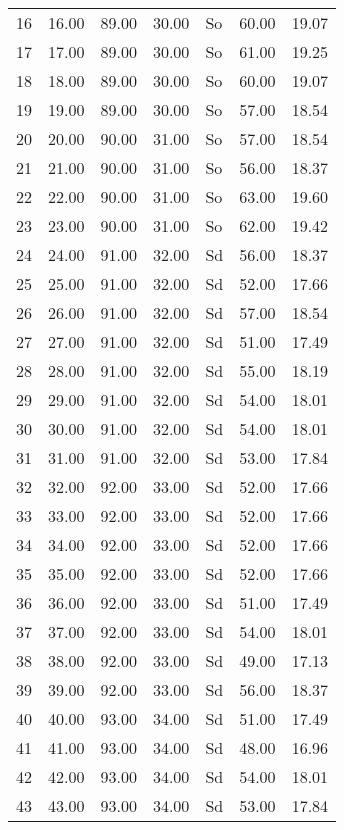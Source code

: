 \begin{center}
\begin{longtable}{|p{0.4in}|p{0.7in}|p{0.6in}|p{0.6in}|p{0.6in}|p{0.6in}|p{0.6in}|}
  16 & 16.00 & 89.00 & 30.00 & So & 60.00 & 19.07 \\ 
  17 & 17.00 & 89.00 & 30.00 & So & 61.00 & 19.25 \\ 
  18 & 18.00 & 89.00 & 30.00 & So & 60.00 & 19.07 \\ 
  19 & 19.00 & 89.00 & 30.00 & So & 57.00 & 18.54 \\ 
  20 & 20.00 & 90.00 & 31.00 & So & 57.00 & 18.54 \\ 
  21 & 21.00 & 90.00 & 31.00 & So & 56.00 & 18.37 \\ 
  22 & 22.00 & 90.00 & 31.00 & So & 63.00 & 19.60 \\ 
  23 & 23.00 & 90.00 & 31.00 & So & 62.00 & 19.42 \\ 
  24 & 24.00 & 91.00 & 32.00 & Sd & 56.00 & 18.37 \\ 
  25 & 25.00 & 91.00 & 32.00 & Sd & 52.00 & 17.66 \\ 
  26 & 26.00 & 91.00 & 32.00 & Sd & 57.00 & 18.54 \\ 
  27 & 27.00 & 91.00 & 32.00 & Sd & 51.00 & 17.49 \\ 
  28 & 28.00 & 91.00 & 32.00 & Sd & 55.00 & 18.19 \\ 
  29 & 29.00 & 91.00 & 32.00 & Sd & 54.00 & 18.01 \\ 
  30 & 30.00 & 91.00 & 32.00 & Sd & 54.00 & 18.01 \\ 
  31 & 31.00 & 91.00 & 32.00 & Sd & 53.00 & 17.84 \\ 
  32 & 32.00 & 92.00 & 33.00 & Sd & 52.00 & 17.66 \\ 
  33 & 33.00 & 92.00 & 33.00 & Sd & 52.00 & 17.66 \\ 
  34 & 34.00 & 92.00 & 33.00 & Sd & 52.00 & 17.66 \\ 
  35 & 35.00 & 92.00 & 33.00 & Sd & 52.00 & 17.66 \\ 
  36 & 36.00 & 92.00 & 33.00 & Sd & 51.00 & 17.49 \\ 
  37 & 37.00 & 92.00 & 33.00 & Sd & 54.00 & 18.01 \\ 
  38 & 38.00 & 92.00 & 33.00 & Sd & 49.00 & 17.13 \\ 
  39 & 39.00 & 92.00 & 33.00 & Sd & 56.00 & 18.37 \\ 
  40 & 40.00 & 93.00 & 34.00 & Sd & 51.00 & 17.49 \\ 
  41 & 41.00 & 93.00 & 34.00 & Sd & 48.00 & 16.96 \\ 
  42 & 42.00 & 93.00 & 34.00 & Sd & 54.00 & 18.01 \\ 
  43 & 43.00 & 93.00 & 34.00 & Sd & 53.00 & 17.84 \\ 

\end{longtable}
\end{center}
